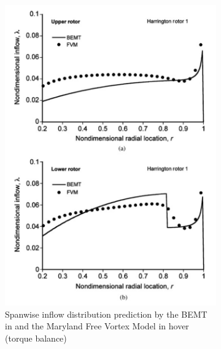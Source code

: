 \begin{figure}[H]
\captionsetup[subfigure]{justification=centering}
\begin{subfigure}[t]{0.5\textwidth}
    \centering
    \includegraphics[width=\textwidth]{Figures/Leishman_inflow.png}
    \caption{Spanwise inflow distribution prediction by the BEMT in \cite{BEMT} and the Maryland Free Vortex Model in hover (torque balance)}
    \label{fig:blade2d}
\end{subfigure}
\begin{subfigure}[t]{0.5\textwidth}
    \centering

\end{subfigure}
\end{figure}
